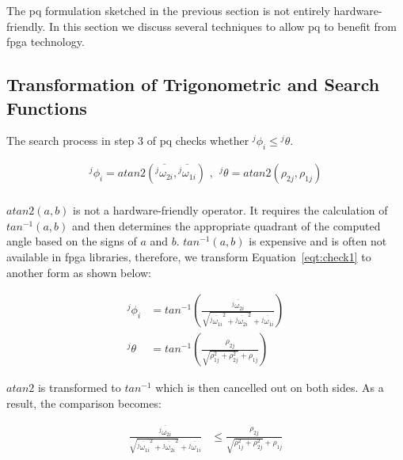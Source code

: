 The \gls{pq} formulation sketched in the previous section is not entirely hardware-friendly.
In this section we discuss several techniques to allow \gls{pq} to benefit from \gls{fpga} technology.

\subsection{Transformation of Trigonometric and Search Functions}
\label{sec:trigo}
The search process in step 3 of \gls{pq} checks whether \linebreak ${^j\phi}_i \le {^j\theta}$.

\begin{equation}
\begin{aligned}
{^j\phi}_i = atan2 \left ( \overline{{^j\omega}_{2i}},\overline{{^j\omega}_{1i}} \right ) \mbox{ , } \;
{^j\theta} = atan2 \left ( \rho_{2j},\rho_{1j} \right ) \\
\end{aligned}
\label{eqt:check1}
\end{equation}

$atan2(a,b)$ is not a hardware-friendly operator.
It requires the calculation of $tan^{-1}(a,b)$ and then determines the appropriate quadrant of the computed angle based on the signs of $a$ and $b$.
$tan^{-1}(a,b)$ is expensive and is often not available in \gls{fpga} libraries, therefore, we transform Equation~\ref{eqt:check1} to another form as shown below:

\begin{equation}
\begin{aligned}
{^j\phi}_i &= tan^{-1} \left ( \frac{\overline{{^j\omega}_{2i}}}{\sqrt{\overline{{^j\omega}_{1i}}^2+\overline{{^j\omega}_{2i}}^2}+\overline{{^j\omega}_{1i}}} \right )\\
{^j\theta} &= tan^{-1} \left ( \frac{\rho_{2j}}{\sqrt{\rho_{1j}^2+\rho_{2j}^2}+\rho_{1j}} \right ) 
\end{aligned}
\label{eqt:check2}
\end{equation}

$atan2$ is transformed to $tan^{-1}$ which is then cancelled out on both sides.
As a result, the comparison becomes:

\begin{equation}
\begin{aligned}
\frac{\overline{{^j\omega}_{2i}}}{\sqrt{\overline{{^j\omega}_{1i}}^2+\overline{{^j\omega}_{2i}}^2}+\overline{{^j\omega}_{1i}}} &\le \frac{\rho_{2j}}{\sqrt{\rho_{1j}^2+\rho_{2j}^2}+\rho_{1j}}
\end{aligned}
\label{eqt:check3}
\end{equation}

